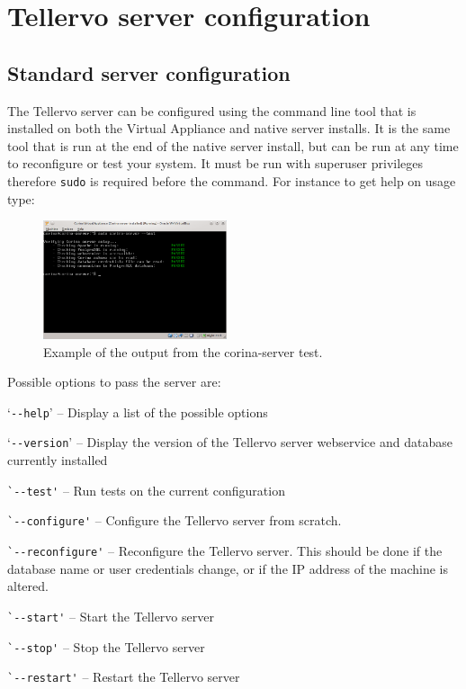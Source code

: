 \section{Tellervo server configuration}
\label{txt:serverConfig}
\subsection{Standard server configuration}
The Tellervo server can be configured using the command line tool that is installed on both the Virtual Appliance and native server installs.  It is the same tool that is run at the end of the native server install, but can be run at any time to reconfigure or test your system.  It must be run with superuser privileges therefore \verb|sudo| is required before the command.  For instance to get help on usage type:


\begin{figure}
  \begin{center}
    \includegraphics[width=0.48\textwidth]{Images/corina-server-terminal.png}
  \end{center}
  \caption{Example of the output from the corina-server test.}
  \label{fig:serverTerminal}
\end{figure}

Possible options to pass the server are:

\begin{itemize*}
 \item `\verb|--help|' -- Display a list of the possible options
 \item `\verb|--version|' -- Display the version of the Tellervo server webservice and database currently installed
 \item \verb|`--test'| -- Run tests on the current configuration
 \item \verb|`--configure'| -- Configure the Tellervo server from scratch.  
 \item \verb|`--reconfigure'| -- Reconfigure the Tellervo server.  This should be done if the database name or user credentials change, or if the IP address of the machine is altered.
 \item \verb|`--start'| -- Start the Tellervo server
 \item \verb|`--stop'| -- Stop the Tellervo server
 \item \verb|`--restart'| -- Restart the Tellervo server
\end{itemize*} 

